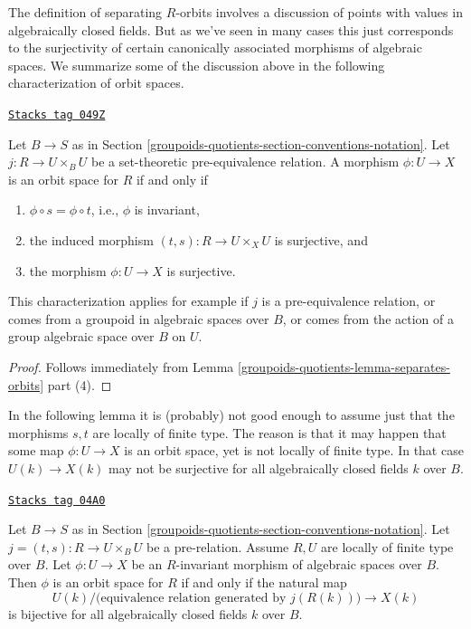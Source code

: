 The definition of separating $R$-orbits involves a discussion of
points with values in algebraically closed fields. But as we've seen
in many cases this just corresponds to the surjectivity of certain
canonically associated morphisms of algebraic spaces.
We summarize some of the discussion above in the following characterization
of orbit spaces.

\begin{lemma}
\label{groupoids-quotients-lemma-orbit-space}
\href{https://stacks.math.columbia.edu/tag/049Z}{\texttt{Stacks tag 049Z}}

Let $B \to S$ as in Section \ref{groupoids-quotients-section-conventions-notation}.
Let $j : R \to U \times_B U$ be a set-theoretic pre-equivalence
relation. A morphism $\phi : U \to X$ is an orbit space for $R$ if and only if
\begin{enumerate}
\item $\phi \circ s = \phi \circ t$, i.e., $\phi$ is invariant,
\item the induced morphism $(t, s) : R \to U \times_X U$ is surjective, and
\item the morphism $\phi : U \to X$ is surjective.
\end{enumerate}
This characterization applies for example if $j$ is a pre-equivalence relation,
or comes from a groupoid in algebraic spaces over $B$, or comes from the action
of a group algebraic space over $B$ on $U$.
\end{lemma}

\begin{proof}
Follows immediately from Lemma \ref{groupoids-quotients-lemma-separates-orbits} part (4).
\end{proof}

In the following lemma it is (probably) not good enough to assume just that
the morphisms $s, t$ are locally of finite type. The reason is that
it may happen that some map $\phi : U \to X$ is an orbit space, yet is
not locally of finite type. In that case $U(k) \to X(k)$ may not
be surjective for all algebraically closed fields $k$ over $B$.

\begin{lemma}
\label{groupoids-quotients-lemma-orbit-space-locally-finite-type-over-base}
\href{https://stacks.math.columbia.edu/tag/04A0}{\texttt{Stacks tag 04A0}}

Let $B \to S$ as in Section \ref{groupoids-quotients-section-conventions-notation}.
Let $j = (t, s) : R \to U \times_B U$ be a pre-relation.
Assume $R, U$ are locally of finite type over $B$.
Let $\phi : U \to X$ be an $R$-invariant morphism of algebraic spaces over $B$.
Then $\phi$ is an orbit space for $R$ if and only if the natural map
$$
U(k)/\big(\text{equivalence relation generated by }j(R(k))\big)
\longrightarrow
X(k)
$$
is bijective for all algebraically closed fields $k$ over $B$.
\end{lemma}

